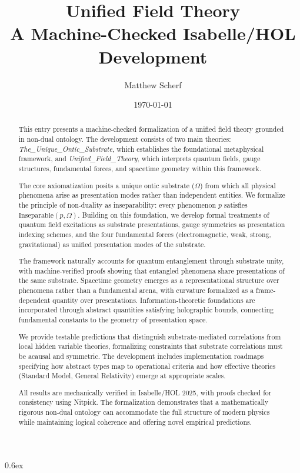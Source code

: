\documentclass[11pt,a4paper]{article}
\title{Unified Field Theory\\[0.25em]\large A Machine-Checked Isabelle/HOL Development}
\author{Matthew Scherf}
\date{\today}
\begin{document}
\maketitle

\begin{abstract}
This entry presents a machine-checked formalization of a unified field theory grounded in non-dual ontology. The development consists of two main theories: \textit{The\_Unique\_Ontic\_Substrate}, which establishes the foundational metaphysical framework, and \textit{Unified\_Field\_Theory}, which interprets quantum fields, gauge structures, fundamental forces, and spacetime geometry within this framework.

The core axiomatization posits a unique ontic substrate ($\Omega$) from which all physical phenomena arise as presentation modes rather than independent entities. We formalize the principle of non-duality as inseparability: every phenomenon $p$ satisfies $\text{Inseparable}(p, \Omega)$. Building on this foundation, we develop formal treatments of quantum field excitations as substrate presentations, gauge symmetries as presentation indexing schemes, and the four fundamental forces (electromagnetic, weak, strong, gravitational) as unified presentation modes of the substrate.

The framework naturally accounts for quantum entanglement through substrate unity, with machine-verified proofs showing that entangled phenomena share presentations of the same substrate. Spacetime geometry emerges as a representational structure over phenomena rather than a fundamental arena, with curvature formalized as a frame-dependent quantity over presentations. Information-theoretic foundations are incorporated through abstract quantities satisfying holographic bounds, connecting fundamental constants to the geometry of presentation space.

We provide testable predictions that distinguish substrate-mediated correlations from local hidden variable theories, formalizing constraints that substrate correlations must be acausal and symmetric. The development includes implementation roadmaps specifying how abstract types map to operational criteria and how effective theories (Standard Model, General Relativity) emerge at appropriate scales.

All results are mechanically verified in Isabelle/HOL 2025, with proofs checked for consistency using Nitpick. The formalization demonstrates that a mathematically rigorous non-dual ontology can accommodate the full structure of modern physics while maintaining logical coherence and offering novel empirical predictions.
\end{abstract}

\tableofcontents
\bigskip

\parindent 0pt \parskip 0.6ex




\end{document}
